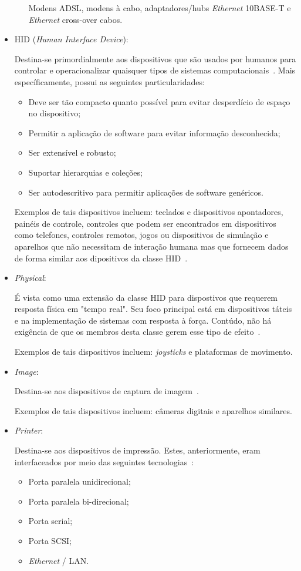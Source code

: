 \begin{itemize}
\begin{itemize}
		Modens ADSL, modens à cabo, adaptadores/hubs \emph{Ethernet} 10BASE-T e \emph{Ethernet} cross-over cabos.
	\end{itemize}
	\item HID (\emph{Human Interface Device}): 

	Destina-se primordialmente aos dispositivos que são usados por humanos para controlar e operacionalizar quaisquer tipos de sistemas computacionais~\cite{hid}. Mais específicamente, possui as seguintes particularidades:
	\begin{itemize}
		\item Deve ser tão compacto quanto possível para evitar desperdício de espaço no dispositivo;
		\item Permitir a aplicação de software para evitar informação desconhecida;
		\item Ser extensível e robusto;
		\item Suportar hierarquias e coleções;
		\item Ser autodescritivo para permitir aplicações de software genéricos.
	\end{itemize}

	Exemplos de tais dispositivos incluem: teclados e dispositivos apontadores, painéis de controle, controles que podem ser encontrados em dispositivos como telefones, controles remotos, jogos ou dispositivos de simulação e aparelhos que não necessitam de interação humana mas que fornecem dados de forma similar aos dipositivos da classe HID~\cite{hid}.
	\item \emph{Physical}: 

	É vista como uma extensão da classe HID para dispostivos que requerem resposta física em "tempo real". Seu foco principal está em dispositivos táteis e na implementação de sistemas com resposta à força. Contúdo, não há exigência de que os membros desta classe gerem esse tipo de efeito~\cite{usbphysicalclass}.

	Exemplos de tais dispositivos incluem: \emph{joysticks} e plataformas de movimento.
	\item \emph{Image}: 

	Destina-se aos dispositivos de captura de imagem~\cite{usbimageclass}.

	Exemplos de tais dispositivos incluem: câmeras digitais e aparelhos similares.
	\item \emph{Printer}: 

	Destina-se aos dispositivos de impressão. Estes, anteriormente, eram interfaceados por meio das seguintes tecnologias~\cite{usbprintclass}:
	\begin{itemize}
		\item Porta paralela unidirecional;
		\item Porta paralela bi-direcional;
		\item Porta serial;
		\item Porta SCSI;
		\item \emph{Ethernet} / LAN.
	\end{itemize}


\end{itemize}
